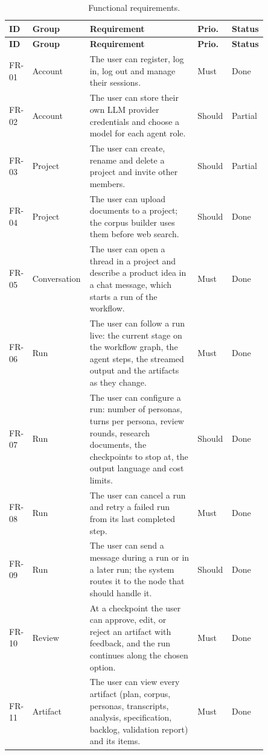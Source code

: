 \begingroup{}
\begin{longtable}{|p{0.08\linewidth}|p{0.16\linewidth}|p{0.41\linewidth}|p{0.09\linewidth}|p{0.11\linewidth}|}
    \caption{Functional requirements.}
    \label{tab:sd-fr} \\
    \hline
    \textbf{ID} & \textbf{Group} & \textbf{Requirement} & \textbf{Prio.} & \textbf{Status} \\
    \hline
    \endfirsthead
    \hline
    \textbf{ID} & \textbf{Group} & \textbf{Requirement} & \textbf{Prio.} & \textbf{Status} \\
    \hline
    \endhead
    FR-01 & Account & The user can register, log in, log out and manage their sessions. & Must & Done \\ \hline
    FR-02 & Account & The user can store their own LLM provider credentials and choose a model for each agent role. & Should & Partial \\ \hline
    FR-03 & Project & The user can create, rename and delete a project and invite other members. & Should & Partial \\ \hline
    FR-04 & Project & The user can upload documents to a project; the corpus builder uses them before web search. & Should & Done \\ \hline
    FR-05 & Conversation & The user can open a thread in a project and describe a product idea in a chat message, which starts a run of the workflow. & Must & Done \\ \hline
    FR-06 & Run & The user can follow a run live: the current stage on the workflow graph, the agent steps, the streamed output and the artifacts as they change. & Must & Done \\ \hline
    FR-07 & Run & The user can configure a run: number of personas, turns per persona, review rounds, research documents, the checkpoints to stop at, the output language and cost limits. & Should & Done \\ \hline
    FR-08 & Run & The user can cancel a run and retry a failed run from its last completed step. & Must & Done \\ \hline
    FR-09 & Run & The user can send a message during a run or in a later run; the system routes it to the node that should handle it. & Should & Done \\ \hline
    FR-10 & Review & At a checkpoint the user can approve, edit, or reject an artifact with feedback, and the run continues along the chosen option. & Must & Done \\ \hline
    FR-11 & Artifact & The user can view every artifact (plan, corpus, personas, transcripts, analysis, specification, backlog, validation report) and its items. & Must & Done \\ \hline

\end{longtable}
